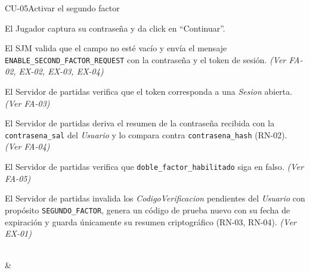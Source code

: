 \begin{fichacu}{CU-05}{Activar el segundo factor}
{\begin{cuenum}[start=1]
      \item El Jugador captura su contraseña y da click en ``Continuar''.
      \item El SJM valida que el campo no esté vacío y envía el mensaje \texttt{ENABLE\_\allowbreak{}SECOND\_\allowbreak{}FACTOR\_\allowbreak{}REQUEST} con la contraseña y el token de sesión. \textit{(Ver \mbox{FA-02}, \mbox{EX-02}, \mbox{EX-03}, \mbox{EX-04})}
      \item El Servidor de partidas verifica que el token corresponda a una \textit{Sesion} abierta. \textit{(Ver \mbox{FA-03})}
      \item El Servidor de partidas deriva el resumen de la contraseña recibida con la \texttt{contrasena\_\allowbreak{}sal} del \textit{Usuario} y lo compara contra \texttt{contrasena\_\allowbreak{}hash} (\mbox{RN-02}). \textit{(Ver \mbox{FA-04})}
      \item El Servidor de partidas verifica que \texttt{doble\_\allowbreak{}factor\_\allowbreak{}habilitado} siga en falso. \textit{(Ver \mbox{FA-05})}
      \item El Servidor de partidas invalida los \textit{CodigoVerificacion} pendientes del \textit{Usuario} con propósito \texttt{SEGUNDO\_\allowbreak{}FACTOR}, genera un código de prueba nuevo con su fecha de expiración y guarda únicamente su resumen criptográfico (\mbox{RN-03}, \mbox{RN-04}). \textit{(Ver \mbox{EX-01})}
    \end{cuenum}} \\
   & 
\end{fichacu}
